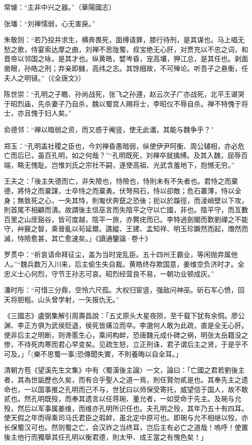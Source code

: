 常璩：“主非中兴之器。”（華陽國志）

张璠：“刘禅懦弱，心无害戾。”

朱敬则：“若乃投井求生，横奔畏死，面缚请罪，膝行待刑，是其谋也。马上唱无愁之歌，侍宴索达摩之曲，刘禅不思陇蜀，叔宝绝无心肝，对贾充以不忠之词，和晋帝以邻国之咏，是其才也。纵黄皓，嬖岑昏，宠高壤，狎江总，是其任也。剥面凿眼，孙皓之刑；弃亲即雠，高纬之志。其馀细故，不可殚论。听吾子之悬衡，任夫人之明镜。”（《全唐文》）

陈世崇：“孔明之子瞻、孙尚战死，张飞之孙遵，赵云次子广亦战死，北平王谌哭于昭烈庙，先杀妻子乃自杀，魏以蜀宫人赐将士，李昭仪不辱自杀。禅不特愧于将士，亦且愧于妇人矣。”

俞德邻：“禅以暗弱之资，而又惑于阉竖，使无此谶，其能与魏争乎？”

郑玉：“孔明盖社稷之臣也，今刘禅昏愚暗弱，纵使伊尹阿衡、周公辅相，亦必危亡而后已，虽百孔明，如之何哉？”“孔明既死，刘禅卒就擒缚。及其入魏，屈辱百端，略无愧耻。岂惟刘氏之宗社不嗣，遂使高祖、光武含羞地下，抱憾无穷。”

王夫之：「後主失德而亡，非失險也，恃險也，恃則未有不失者也。君恃之而棄德，將恃之而棄謀，士卒恃之而棄勇。伏弩飛石，恃以卻敵；危石叢薄，恃以全身；無致死之心，一失其恃，則匍伏奔竄之恐後；扼以於蹊徑，而淩峭壁以下攻，則首尾不相顧而潰。故謂後主信巫言而失陰平之守以亡國，非也。陰平守，而亙數百里之山厓谿谷，皆可度越，陰平一旅，亦贅疣而已。李特過劍閣而歎劉禪之不能守，艸竅之智，乘晉亂以茍延爾。譙縱、王建、孟知祥、明玉珍蹶然而起，熸然而滅，恃險愈甚，其亡愈速矣。」《讀通鑒論·卷十》

罗贯中：“祈哀请命拜征尘，盖为当时宠乱臣。五十四州王霸业，等闲抛弃属他人。”“魏兵数万入川来，后主偷生失自裁。黄皓终存欺国意，姜维空负济时才。全忠义士心何烈，守节王孙志可哀。昭烈经营良不易，一朝功业顿成灰。”

潘时彤：“可惜三分鼎，空怜六尺孤。大权归宦竖，强敌问神巫。斫石军心愤，回天将胆粗。山头曾学射，一矢报仇无。”

《三國志》盧弼集解引周壽昌說：「五丈原头大星夜陨，至千载下犹有余恫。廖公渊、李正方俱为武侯贬退，侯死皆痛泣而卒。李邈何人敢为此疏，直是全无心肝。使非后主之明断，则谗慝生心，乘间构衅，恐唐魏元成仆碑之祸，明张太岳籍没之惨，不待死肉寒而君心早变矣。见疏生怒，立正刑诛，君子谓后主之贤，于是乎不可及。」「(樂不思蜀一事)恐傳聞失實，不則養晦以自全耳。」

清朝方苞《望溪先生文集》中有〈蜀漢後主論〉一文，論曰：「亡國之君若劉後主者，其為世詬歷也久矣，而有合乎聖人之道一焉，則任賢勿貳是也。其奉先主之遗命也，一以国事推之孔明而己不与，世犹曰以师保受寄托，威望信于国人，故不敢贰也。然孔明既殁，而奉其遗言以任蒋琬、董允者，一如受命于先主。及琬与允殁，然后以军事属姜维，而维亦孔明所识任也。夫孔明之殁，其年乃五十有四耳。使天假之年而得乘司马氏君臣之瑕衅，虽北定中原可也。即琬与允不相继以殁，亦长保蜀汉可也。然则蜀之亡，会汉祚之当终耳，岂后主有必亡之道哉！嗚呼！使置後主他行而獨舉其任孔明以衡君德，則太甲、成王當之有愧色矣！」

